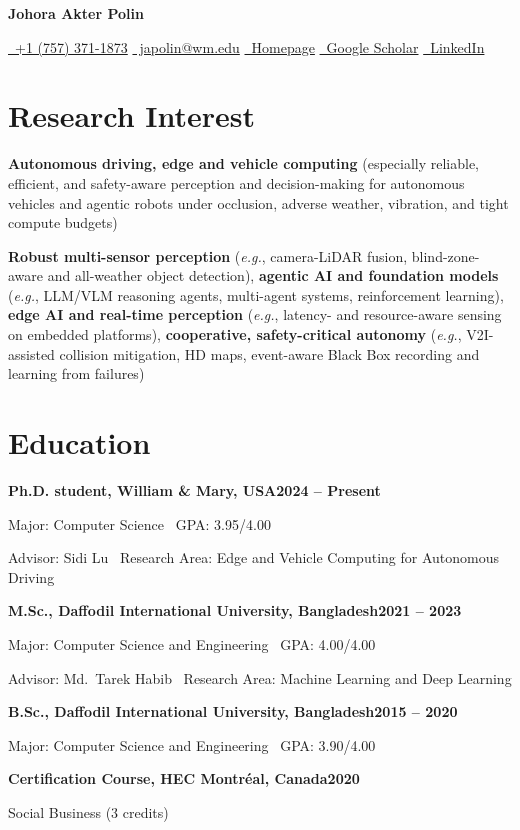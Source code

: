 \documentclass[11pt,letterpaper]{article}
\newcommand{\scholaricon}{\faGraduationCap}
\newcommand{\scholaricon}{\aiGoogleScholar}
\newenvironment{labelled}[1][5.2em]
  {\begin{description}[leftmargin=#1, labelwidth=\dimexpr#1-0.5em\relax,
                       labelsep=0.5em, align=left, font=\normalfont,
                       itemsep=2pt, topsep=1pt]}
  {\end{description}}
\newcommand{\org}[2]{\par\textbf{#1}\hfill\textbf{#2}\par\nobreak\interlinepenalty=10000}
\newcommand{\entrygap}{\par\vspace{6pt}}
\begin{document}
\begin{center}
  {\fontsize{20}{24}\selectfont\bfseries Johora Akter Polin}\par\vspace{4pt}
  {\small
  \href{tel:+17573711873}{\faPhone\ +1 (757) 371-1873}%
  \enspace\textbar\textbar\enspace
  \href{mailto:japolin@wm.edu}{\faEnvelope\ japolin@wm.edu}%
  \enspace\textbar\textbar\enspace
  \href{https://roboworld314.github.io/japolin.org/}{\faGlobe\ Homepage}%
  \enspace\textbar\textbar\enspace
  \href{https://scholar.google.com/citations?user=50AFRskAAAAJ}{\scholaricon\ Google Scholar}%
  \enspace\textbar\textbar\enspace
  \href{https://www.linkedin.com/in/johora-akter-polin-577759232/}{\faLinkedin\ LinkedIn}\par}
\end{center}
\vspace{-4pt}

\section{Research Interest}
\begin{labelled}
  \item[Area:] \textbf{Autonomous driving, edge and vehicle computing}
    (especially reliable, efficient, and safety-aware perception and
    decision-making for autonomous vehicles and agentic robots under occlusion,
    adverse weather, vibration, and tight compute budgets)
  \item[Topics:] \textbf{Robust multi-sensor perception} (\textit{e.g.},
    camera-LiDAR fusion, blind-zone-aware and all-weather object detection),
    \textbf{agentic AI and foundation models} (\textit{e.g.}, LLM/VLM reasoning
    agents, multi-agent systems, reinforcement learning), \textbf{edge AI and
    real-time perception} (\textit{e.g.}, latency- and resource-aware sensing on
    embedded platforms), \textbf{cooperative, safety-critical autonomy}
    (\textit{e.g.}, V2I-assisted collision mitigation, HD maps, event-aware
    Black Box recording and learning from failures)
\end{labelled}

\section{Education}
\org{Ph.D. student, William \& Mary, USA}{2024 -- Present}
Major: Computer Science \textbar\ GPA: 3.95/4.00\par
Advisor: Sidi Lu \textbar\ Research Area: Edge and Vehicle Computing for Autonomous Driving
\entrygap
\org{M.Sc., Daffodil International University, Bangladesh}{2021 -- 2023}
Major: Computer Science and Engineering \textbar\ GPA: 4.00/4.00\par
Advisor: Md.~Tarek Habib \textbar\ Research Area: Machine Learning and Deep Learning
\entrygap
\org{B.Sc., Daffodil International University, Bangladesh}{2015 -- 2020}
Major: Computer Science and Engineering \textbar\ GPA: 3.90/4.00
\entrygap
\org{Certification Course, HEC Montr\'eal, Canada}{2020}
Social Business (3 credits)
\end{document}
